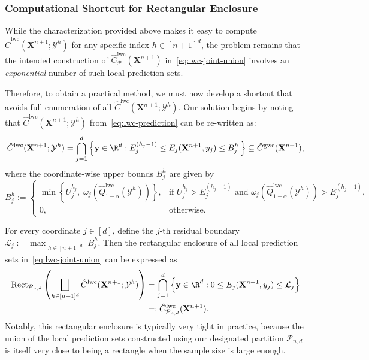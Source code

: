 \subsubsection{Computational Shortcut for Rectangular Enclosure}

While the characterization provided above makes it easy to compute $\hat{C}^{\mathrm{lwc}}(\mathbf{X}^{n+1};\mathcal{Y}^h)$ for any specific index $h \in [n+1]^d$, the problem remains that the intended construction of $\hat{C}^{\mathrm{lwc}}_{\mathcal{P}}(\mathbf{X}^{n+1})$ in~\eqref{eq:lwc-joint-union} involves an {\em exponential} number of such local prediction sets. 

Therefore, to obtain a practical method, we must now develop a shortcut that avoids full enumeration of all $\hat{C}^{\mathrm{lwc}}(\mathbf{X}^{n+1};\mathcal{Y}^h)$.
Our solution begins by noting that $\hat{C}^{\mathrm{lwc}}(\mathbf{X}^{n+1};\mathcal{Y}^h)$ from~\eqref{eq:lwc-prediction} can be re-written as:
\[
\hat{C}^\mathrm{lwc}(\mathbf{X}^{n+1}; \mathcal{Y}^h) = \bigcap_{j=1}^d \left\{ \mathbf y\in\R^d : E^{(h_j-1)}_j \leq E_j(\mathbf{X}^{n+1},y_j) \leq B^h_j \,\right\} \subseteq \hat{C}^\mathrm{gwc}(\mathbf{X}^{n+1}), 
\]
where the coordinate-wise upper bounds $B^h_j$ are given by
\begin{equation} \label{eq:rect-wise-bounds}
B^h_j := 
\begin{cases}
\min\left\{U^{h_j}_j,\; \omega_j(\hat{Q}^{\mathrm{lwc}}_{1-\alpha}(\mathcal{Y}^h))\right\},
& \text{if } U^{h_j}_j > E^{(h_j-1)}_j \text{ and } \omega_j(\hat{Q}^{\mathrm{lwc}}_{1-\alpha}(\mathcal{Y}^h)) > E^{(h_j-1)}_j,\\[0.4em]
0, & \text{otherwise.}
\end{cases}
\end{equation}

For every coordinate $j \in [d]$, define the $j$-th residual boundary $\mathcal{L}_j := \max_{\substack{h \in [n+1]^d}}B^h_j$. 
Then the rectangular enclosure of all local prediction sets in~\eqref{eq:lwc-joint-union} can be expressed as
\begin{equation}
\begin{aligned}
    \mathrm{Rect}_{\mathcal{P}_{n,d}}\left(\bigsqcup_{h \in [n+1]^d} \hat{C}^\mathrm{lwc}(\mathbf{X}^{n+1};\mathcal{Y}^h)\right) &= \bigcap_{j=1}^d \left\{ \mathbf y\in\R^d : 0 \leq E_j(\mathbf{X}^{n+1},y_j) \leq \mathcal{L}_j \right\}\\
&=: \hat{C}^\mathrm{lwc}_{\mathcal{P}_{n,d}}(\mathbf{X}^{n+1}).
\end{aligned}
\end{equation}
Notably, this rectangular enclosure is typically very tight in practice, because the union of the local prediction sets constructed using our designated partition $\mathcal{P}_{n,d}$ is itself very close to being a rectangle when the sample size is large enough.


